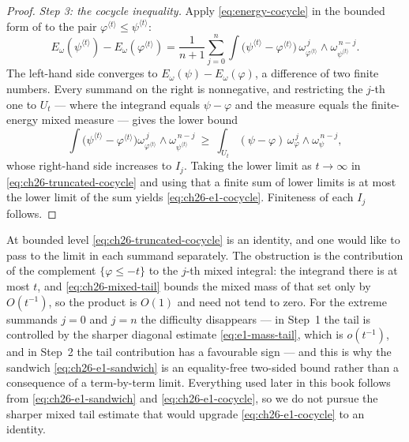 \begin{proof}
\emph{Step 3: the cocycle inequality.}  Apply \eqref{eq:energy-cocycle} in
the bounded form of  to the pair
\(\varphi^{\langle t\rangle}\leq\psi^{\langle t\rangle}\):
\begin{equation}
\label{eq:ch26-truncated-cocycle}
 E_\omega(\psi^{\langle t\rangle})-E_\omega(\varphi^{\langle t\rangle})
 =\frac1{n+1}\sum_{j=0}^n
   \int\bigl(\psi^{\langle t\rangle}-\varphi^{\langle t\rangle}\bigr)\,
   \omega_{\varphi^{\langle t\rangle}}^{\,j}\wedge
   \omega_{\psi^{\langle t\rangle}}^{\,n-j}.
\end{equation}
The left-hand side converges to \(E_\omega(\psi)-E_\omega(\varphi)\), a
difference of two finite numbers.  Every summand on the right is nonnegative,
and restricting the \(j\)-th one to \(U_t\) --- where the integrand equals
\(\psi-\varphi\) and the measure equals the finite-energy mixed measure ---
gives the lower bound
\[
 \int\bigl(\psi^{\langle t\rangle}-\varphi^{\langle t\rangle}\bigr)
  \omega_{\varphi^{\langle t\rangle}}^{\,j}\wedge
  \omega_{\psi^{\langle t\rangle}}^{\,n-j}
 \ \geq\
 \int_{U_t}(\psi-\varphi)\,
  \omega_\varphi^{\,j}\wedge\omega_\psi^{\,n-j},
\]
whose right-hand side increases to \(I_j\).  Taking the lower limit as
\(t\to\infty\) in \eqref{eq:ch26-truncated-cocycle} and using that a finite
sum of lower limits is at most the lower limit of the sum yields
\eqref{eq:ch26-e1-cocycle}.  Finiteness of each \(I_j\) follows.
\end{proof}

\begin{remark}
\label{rem:ch26-cocycle-inequality}
At bounded level \eqref{eq:ch26-truncated-cocycle} is an identity, and one
would like to pass to the limit in each summand separately.  The obstruction
is the contribution of the complement \(\{\varphi\leq-t\}\) to the \(j\)-th
mixed integral: the integrand there is at most \(t\), and
\eqref{eq:ch26-mixed-tail} bounds the mixed mass of that set only by
\(O(t^{-1})\), so the product is \(O(1)\) and need not tend to zero.  For the
extreme summands \(j=0\) and \(j=n\) the difficulty disappears --- in Step~1
the tail is controlled by the sharper diagonal estimate
\eqref{eq:e1-mass-tail}, which is \(o(t^{-1})\), and in Step~2 the tail
contribution has a favourable sign --- and this is why the sandwich
\eqref{eq:ch26-e1-sandwich} is an equality-free two-sided bound rather than a
consequence of a term-by-term limit.  Everything used later in this book
follows from \eqref{eq:ch26-e1-sandwich} and
\eqref{eq:ch26-e1-cocycle}, so we do not pursue the sharper mixed tail
estimate that would upgrade \eqref{eq:ch26-e1-cocycle} to an identity.
\end{remark}

